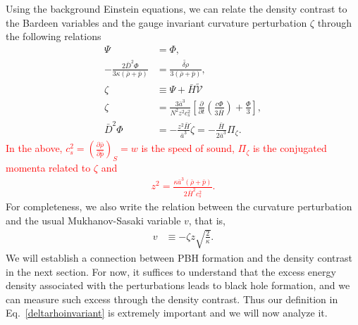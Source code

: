 \documentclass[a4paper,11pt]{article}
\newcommand{\dpar}[1]{\left(#1 \right)}
\begin{document}
Using the background Einstein equations, we can relate the density contrast to the
Bardeen variables and the gauge invariant curvature perturbation $\zeta$ through the
following relations~\cite{Mukhanov1992, Vitenti2013}
\begin{align}
	\Psi                                                    & =\Phi,
	\\
	\label{deltarho}
	-\frac{2\bar{D}^2 \Phi}{3  \kappa (\bar{\rho}+\bar{p})} & =   \frac{{\tilde{\delta\rho}}} {3(\bar{\rho}+\bar{p})}
	,
	\\
	\label{vrelation}
	\zeta                                                   & \equiv \Psi  + \bar{H} \tilde{\mathcal{V}}
	\\
	\label{zeta2}
	\zeta                                                   & = \frac{3  \bar{a}^3}{N^2z^2 c_s^2 } \left[\frac{\partial}{\partial t}\left(\frac{c\Phi }{3\bar{H}}\right) + \frac{\Phi}{3}\right]
	,                                                                                                                                                                                            \\
	\label{phiz}
	\bar{D}^{2} \Phi                                        & =  - \frac{z^2\bar{H}}{\bar{a}^3} \dot{\zeta} = -\frac{\bar{H}}{2\bar{a}^3} \Pi_\zeta
	.\end{align}
\textcolor{red}{In the above, $c^{2}_s=\dpar{ \frac{\partial\bar{\rho}}{\partial\bar{p}} }_{S}= w$ is the speed of sound, $\Pi_\zeta$ is the conjugated momenta related to $\zeta$ and
	\begin{align}
		\label{zdef}
		z^2=\frac{\kappa \bar{a}^3 (\bar{\rho} + \bar{p})}{2\bar{H}^2 c_{s}^2}
		.\end{align}}
For completeness, we also write the relation between the curvature perturbation and the
usual Mukhanov-Sasaki variable $v$, that is,
\begin{align}
	\label{msv}
	v & \equiv - \zeta z \sqrt{\frac{2}{\kappa}}
	.\end{align}
We will establish a connection between PBH formation and the density contrast in the next section. For now, it suffices to understand that the excess energy density associated with the perturbations leads to black hole formation, and we can measure such excess through the density contrast. Thus our definition in Eq.~\eqref{deltarhoinvariant} is extremely important and we will now analyze it.
\end{document}
